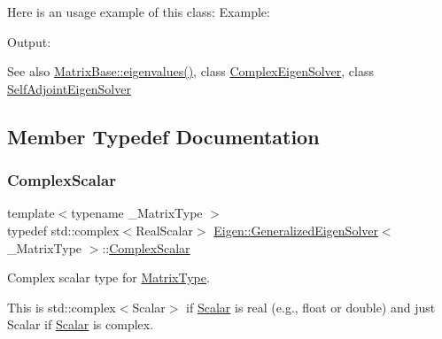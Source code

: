 Here is an usage example of this class\+: Example\+: 
\begin{DoxyCodeInclude}{0}
\end{DoxyCodeInclude}
 Output\+: 
\begin{DoxyVerbInclude}
\end{DoxyVerbInclude}


\begin{DoxySeeAlso}{See also}
\mbox{\hyperlink{class_eigen_1_1_matrix_base_a30430fa3d5b4e74d312fd4f502ac984d}{Matrix\+Base\+::eigenvalues()}}, class \mbox{\hyperlink{class_eigen_1_1_complex_eigen_solver}{Complex\+Eigen\+Solver}}, class \mbox{\hyperlink{class_eigen_1_1_self_adjoint_eigen_solver}{Self\+Adjoint\+Eigen\+Solver}} 
\end{DoxySeeAlso}


\subsection{Member Typedef Documentation}
\mbox{\label{class_eigen_1_1_generalized_eigen_solver_abdec07af91db1345bb4c74066e3d0ea7}} 
\subsubsection{\texorpdfstring{ComplexScalar}{ComplexScalar}}
{\footnotesize\ttfamily template$<$typename \+\_\+\+Matrix\+Type $>$ \\
typedef std\+::complex$<$Real\+Scalar$>$ \mbox{\hyperlink{class_eigen_1_1_generalized_eigen_solver}{Eigen\+::\+Generalized\+Eigen\+Solver}}$<$ \+\_\+\+Matrix\+Type $>$\+::\mbox{\hyperlink{class_eigen_1_1_generalized_eigen_solver_abdec07af91db1345bb4c74066e3d0ea7}{Complex\+Scalar}}}



Complex scalar type for \mbox{\hyperlink{class_eigen_1_1_generalized_eigen_solver_a56f4b9823bb9a267de3aaf48428cd247}{Matrix\+Type}}. 

This is {\ttfamily std\+::complex$<$\+Scalar$>$} if \mbox{\hyperlink{class_eigen_1_1_generalized_eigen_solver_afb318d0b097ff8dd5a7410d31317ca47}{Scalar}} is real (e.\+g., {\ttfamily float} or {\ttfamily double}) and just {\ttfamily Scalar} if \mbox{\hyperlink{class_eigen_1_1_generalized_eigen_solver_afb318d0b097ff8dd5a7410d31317ca47}{Scalar}} is complex. \mbox{\label{class_eigen_1_1_generalized_eigen_solver_acfd144329aca76882069da2fc5d53ef5}} 
